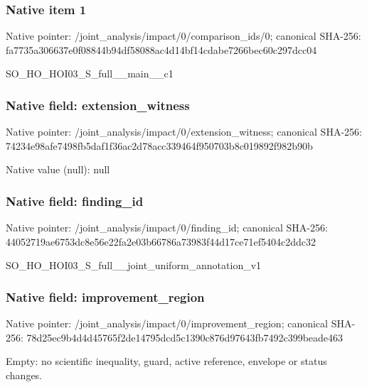 \documentclass[10pt,a4paper]{article}
\begin{document}
\subsubsection{Native item 1}
Native pointer: /joint\_\allowbreak{}analysis/impact/0/comparison\_\allowbreak{}ids/0; canonical SHA-256: fa7735a306637e0f08844b94df58088ac4d14bf14cdabe7266bec60c297dcc04

\begingroup\raggedright\sloppy SO\_\allowbreak{}HO\_\allowbreak{}HOI03\_\allowbreak{}S\_\allowbreak{}full\_\allowbreak{}\_\allowbreak{}main\_\allowbreak{}\_\allowbreak{}c1\par\endgroup

\subsubsection{Native field: extension\_\allowbreak{}witness}
Native pointer: /joint\_\allowbreak{}analysis/impact/0/extension\_\allowbreak{}witness; canonical SHA-256: 74234e98afe7498fb5daf1f36ac2d78acc339464f950703b8c019892f982b90b

Native value (null): null

\subsubsection{Native field: finding\_\allowbreak{}id}
Native pointer: /joint\_\allowbreak{}analysis/impact/0/finding\_\allowbreak{}id; canonical SHA-256: 44052719ae6753dc8e56e22fa2e03b66786a73983f44d17ce71ef5404c2ddc32

\begingroup\raggedright\sloppy SO\_\allowbreak{}HO\_\allowbreak{}HOI03\_\allowbreak{}S\_\allowbreak{}full\_\allowbreak{}\_\allowbreak{}joint\_\allowbreak{}uniform\_\allowbreak{}annotation\_\allowbreak{}v1\par\endgroup

\subsubsection{Native field: improvement\_\allowbreak{}region}
Native pointer: /joint\_\allowbreak{}analysis/impact/0/improvement\_\allowbreak{}region; canonical SHA-256: 78d25ec9b4d4d45765f2de14795dcd5c1390c876d97643fb7492c399beade463

\begingroup\raggedright\sloppy Empty:\allowbreak{} no scientific inequality,\allowbreak{} guard,\allowbreak{} active reference,\allowbreak{} envelope or status changes.\par\endgroup
\end{document}
